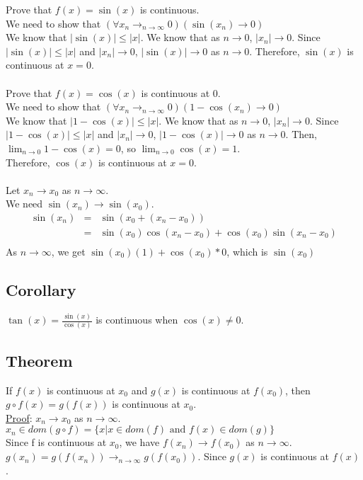 \documentclass[11pt]{article}
\begin{document}
		Prove that $f(x) = \sin(x)$ is continuous.\\ 
		We need to show that $(\forall x_n \to_{n \to \infty} 0)(\sin(x_n) \to 0)$\\
		We know that $|\sin(x)| \le |x|$.
		We know that as $n \to 0$, $|x_n| \to 0$.
		Since $|\sin(x)| \le |x|$ and $|x_n| \to 0$, $|\sin(x)| \to 0$ as $n \to
		0$. Therefore, $\sin(x)$ is continuous at $x = 0$.\\\\
%
		Prove that $f(x) = \cos(x)$ is continuous at 0.\\
		We need to show that $(\forall x_n \to_{n \to \infty} 0)(1 - \cos(x_n) \to 0)$\\
		We know that $|1 - \cos(x)| \le |x|$.
		We know that as $n \to 0$, $|x_n| \to 0$.
		Since $|1 - \cos(x)| \le |x|$ and $|x_n| \to 0$, $|1 - \cos(x)| \to 0$ 
		as $n \to	0$. Then, $\lim_{n \to 0}{1 - \cos(x)} = 0$, so
		$\lim_{n \to 0}{\cos(x)} = 1$.\\
		Therefore, $\cos(x)$ is continuous at $x = 0$.\\\\
%
		Let $x_n \to x_0$ as $n \to \infty$. \\
		We need $\sin(x_n) \to \sin(x_0)$. \\
		\begin{eqnarray*}
			\sin(x_n) &=& \sin(x_0 + (x_n - x_0)) \\
			& = & \sin(x_0)\cos(x_n - x_0) + \cos(x_0)\sin(x_n - x_0) \\
		\end{eqnarray*}
		As $n \to \infty$, we get $\sin(x_0)(1) + \cos(x_0) * 0$, which is
		$\sin(x_0)$\\

		\subsection*{Corollary}
			$\tan(x) = \frac{\sin(x)}{\cos(x)}$ is continuous when $\cos(x) \not=
			0$.
		\subsection*{Theorem}
			If $f(x)$ is continuous at $x_0$ and $g(x)$ is continuous at $f(x_0)$,
			then $g \circ f(x) = g(f(x))$ is continuous at $x_0$.\\
			\underline{Proof}:
				$x_n \to x_0$ as $n \to \infty$.\\
				$x_n \in dom(g \circ f) = \{ x | x \in dom(f) \text{ and } f(x) \in dom(g) \}$\\
				Since f is continuous at $x_0$, we have $f(x_n) \to f(x_0)$ as $n \to
				\infty$.\\
				$g(x_n) = g(f(x_n)) \to_{n \to \infty} g(f(x_0))$. Since $g(x)$ is
				continuous at $f(x)$.\\\\
\end{document}
